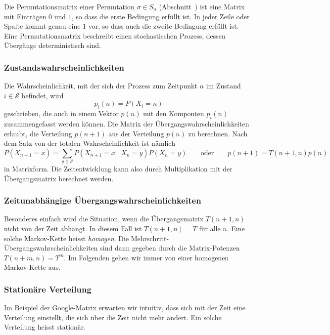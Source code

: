 \begin{beispiel}
Die Permutationsmatrix einer Permutation $\sigma\in S_n$ 
(Abschnitt~\label{buch:section:permutationsmatrizen})
%
ist eine Matrix mit Einträgen $0$ und $1$, so dass die erste Bedingung
erfüllt ist.
In jeder Zeile oder Spalte kommt genau eine $1$ vor, so dass auch die
zweite Bedingung erfüllt ist.
Eine Permutationsmatrix beschreibt einen stochastischen Prozess, dessen
Übergänge deterministisch sind.
\end{beispiel}

\subsubsection{Zustandswahrscheinlichkeiten}
Die Wahrscheinlichkeit, mit der sich der Prozess zum Zeitpunkt $n$
im Zustand $i\in\mathcal{S}$ befindet, wird
\[
p_i(n)
=
P(X_i=n)
\]
geschrieben, die auch in einem Vektor $p(n)$ mit den Komponten
$p_i(n)$ zusammengefasst werden können.
Die Matrix der Übergangswahrscheinlichkeiten erlaubt, die Verteilung
$p(n+1)$ aus der Verteilung $p(n)$ zu berechnen.
Nach dem Satz von der totalen Wahrscheinlichkeit ist nämlich
\[
P(X_{n+1}=x)
=
\sum_{y\in\mathcal{S}} 
P(X_{n+1}=x\mid X_n=y) P(X_n=y)
\qquad\text{oder}\qquad
p(n+1) = T(n+1,n) p(n)
\]
in Matrixform.
Die Zeitentwicklung kann also durch Multiplikation mit der Übergangsmatrix
berechnet werden.

\subsubsection{Zeitunabhängige Übergangswahrscheinlichkeiten}
Besonderes einfach wird die Situation, wenn die Übergangsmatrix $T(n+1,n)$
nicht von der Zeit abhängt.
In diesem Fall ist $T(n+1,n) = T$ für alle $n$.
Eine solche Markov-Kette heisst {\em homogen}.
%
Die Mehrschritt-Übergangswahrscheinlichkeiten sind dann gegeben
durch die Matrix-Potenzen $T(n+m,n)=T^m$.
Im Folgenden gehen wir immer von einer homogenen Markov-Kette aus.

\subsubsection{Stationäre Verteilung}
Im Beispiel der Google-Matrix erwarten wir intuitiv, dass sich mit
der Zeit eine Verteilung einstellt,  die sich über die Zeit nicht
mehr ändert.
Ein solche Verteilung heisst stationär.

